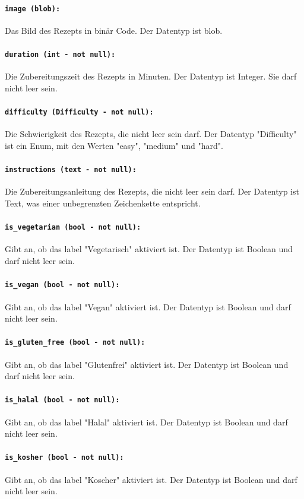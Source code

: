 \documentclass{entwurfsheft}
\begin{document}
\paragraph{\texttt{image (blob):}} Das Bild des Rezepts in binär Code. Der Datentyp ist \Gls{blob}.
\paragraph{\texttt{duration (int - not null):}} Die Zubereitungszeit des Rezepts in Minuten. Der Datentyp ist Integer. Sie darf nicht leer sein.
\paragraph{\texttt{difficulty (Difficulty - not null):}} Die Schwierigkeit des Rezepts, die nicht leer sein darf. Der Datentyp "Difficulty" ist ein Enum, mit den Werten "easy", "medium" und "hard".
\paragraph{\texttt{instructions (text - not null):}} Die Zubereitungsanleitung des Rezepts, die nicht leer sein darf. Der Datentyp ist Text, was einer unbegrenzten Zeichenkette entspricht.
\paragraph{\texttt{is\_vegetarian (bool - not null):}} Gibt an, ob das \Gls{label} "Vegetarisch" aktiviert ist. Der Datentyp ist Boolean und darf nicht leer sein.
\paragraph{\texttt{is\_vegan (bool - not null):}} Gibt an, ob das \Gls{label} "Vegan" aktiviert ist. Der Datentyp ist Boolean und darf nicht leer sein.
\paragraph{\texttt{is\_gluten\_free (bool - not null):}} Gibt an, ob das \Gls{label} "Glutenfrei" aktiviert ist. Der Datentyp ist Boolean und darf nicht leer sein.
\paragraph{\texttt{is\_halal (bool - not null):}} Gibt an, ob das \Gls{label} "Halal" aktiviert ist. Der Datentyp ist Boolean und darf nicht leer sein.
\paragraph{\texttt{is\_kosher (bool - not null):}} Gibt an, ob das \Gls{label} "Koscher" aktiviert ist. Der Datentyp ist Boolean und darf nicht leer sein.
\end{document}
